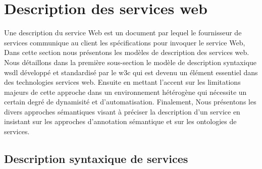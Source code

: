 
  \section{Description des services web}
  \label{sec:ws-description}



  \cite{lopez2008selection} Une description du service Web est un
  document par lequel le fournisseur de services communique au client
  les spécifications pour invoquer le service Web, Dans cette section
  nous présentons les modèles de description des services web. Nous
  détaillons dans la première sous-section le modèle de description
  syntaxique \acrshort{wsdl} \cite{chinnici2007web} développé et
  standardisé par le \acrshort{w3c} qui est devenu un élément
  essentiel dans des technologies services web. Ensuite en mettant
  l'accent sur les limitations majeurs de cette approche dans un
  environnement hétérogène qui nécessite un certain degré de
  dynamisité et d'automatisation.  Finalement, Nous présentons les
  divers approches sémantiques visant à préciser la description d'un
  service en insistant sur les approches d'annotation sémantique et
  sur les ontologies de services.

  \subsection{Description syntaxique de services}
  \label{sec:ws-syntaxique-description}

